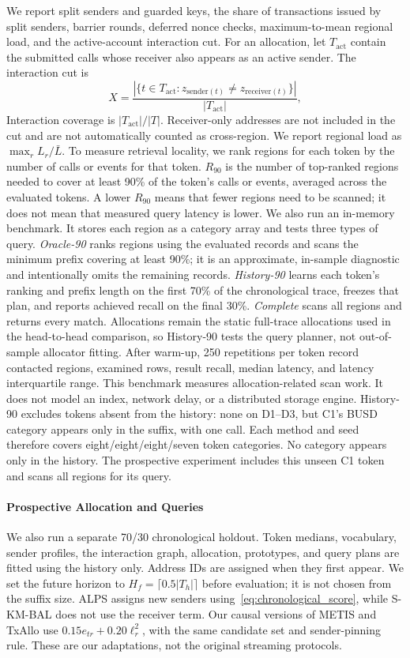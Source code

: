 \documentclass[conference,letterpaper]{IEEEtran}
\begin{document}
We report split senders and guarded keys, the share of transactions issued
by split senders, barrier rounds, deferred nonce checks, maximum-to-mean
regional load, and the active-account interaction cut. For an allocation, let
$T_{\mathrm{act}}$ contain the submitted calls whose receiver also appears as
an active sender. The interaction cut is
\[
X=\frac{|\{t\in T_{\mathrm{act}}:z_{\mathrm{sender}(t)}\neq
z_{\mathrm{receiver}(t)}\}|}{|T_{\mathrm{act}}|},
\]
Interaction coverage is $|T_{\mathrm{act}}|/|T|$. Receiver-only addresses
are not included in the cut and are not automatically counted as
cross-region. We report regional load as $\max_r L_r/\bar L$. To measure
retrieval locality, we rank regions for each token by the number of calls or
events for that token. $R_{90}$ is the number of top-ranked regions needed to
cover at least 90\% of the token's calls or events, averaged across the
evaluated tokens. A lower $R_{90}$ means that fewer regions need to be scanned;
it does not mean that measured query latency is lower. We also run an
in-memory benchmark. It stores each region as a category array and tests
three types of query. \emph{Oracle-90}
ranks regions using the evaluated records and scans the minimum prefix covering
at least 90\%; it is an approximate, in-sample diagnostic and intentionally
omits the remaining records. \emph{History-90} learns each token's ranking and
prefix length on the first 70\% of the chronological trace, freezes that plan,
and reports achieved recall on the final 30\%. \emph{Complete} scans all regions
and returns every match. Allocations remain the static full-trace allocations
used in the head-to-head comparison, so History-90 tests the query planner, not
out-of-sample allocator fitting. After warm-up, 250 repetitions per token record
contacted regions, examined rows, result recall, median latency, and latency
interquartile range. This benchmark measures allocation-related scan work. It does not model an
index, network delay, or a distributed storage engine. History-90 excludes
tokens absent from the history: none on D1--D3, but C1's BUSD category appears
only in the suffix, with one call. Each method and seed therefore covers
eight/eight/eight/seven token categories. No category appears only in the
history. The prospective experiment includes this unseen C1 token and scans
all regions for its query.

\paragraph{Prospective Allocation and Queries}
\label{sec:prospective_protocol}
We also run a separate 70/30 chronological holdout. Token medians, vocabulary,
sender profiles, the interaction graph, allocation, prototypes, and query plans
are fitted using the history only. Address IDs are assigned when they first
appear. We set the future horizon to $H_f=\lceil0.5|T_h|\rceil$ before
evaluation; it is not chosen from the suffix size. ALPS assigns new senders
using~\eqref{eq:chronological_score}, while S-KM-BAL does not use the receiver
term. Our causal versions of METIS and TxAllo use
$0.15e_{tr}+0.20\ell_r^2$, with the same candidate set and sender-pinning
rule. These are our adaptations, not the original streaming protocols.
\end{document}
